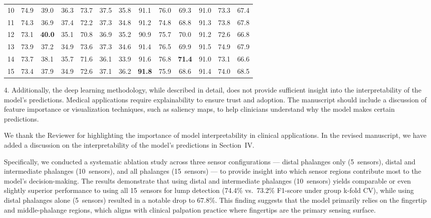 \documentclass[a4paper, onecolumn]{IEEEtran}
\newcommand\blue[1]{{\textcolor{white!30!blue}{#1}}}
\begin{document}
\begin{table}[tbh]
{\begin{tabular}{c c c c| c c c| c c c| c c c}
            10 & 74.9 & 39.0 & 36.3 & 73.7 & 37.5 & 35.8 & 91.1 & 76.0 & 69.3 & 91.0 & 73.3 & 67.4 \\
            11 & 74.3 & 36.9 & 37.4 & 72.2 & 37.3 & 34.8 & 91.2 & 74.8 & 68.8 & 91.3 & 73.8 & 67.8 \\
            12 & 73.1 & \textbf{40.0} & 35.1 & 70.8 & 36.9 & 35.2 & 90.9 & 75.7 & 70.0 & 91.2 & 72.6 & 66.8 \\
            13 & 73.9 & 37.2 & 34.9 & 73.6 & 37.3 & 34.6 & 91.4 & 76.5 & 69.9 & 91.5 & 74.9 & 67.9 \\
            14 & 73.7 & 38.1 & 35.7 & 71.6 & 36.1 & 33.9 & 91.6 & 76.8 & \textbf{71.4} & 91.0 & 73.1 & 66.6 \\
            15 & 73.4 & 37.9 & 34.9 & 72.6 & 37.1 & 36.2 & \textbf{91.8} & 75.9 & 68.6 & 91.4 & 74.0 & 68.5 \\
        \bottomrule
    \end{tabular}
    }
    \label{tab:fine_tuning_all}
\end{table}


\blue{4. Additionally, the deep learning methodology, while described in detail, does not provide sufficient insight into the interpretability of the model's predictions. Medical applications require explainability to ensure trust and adoption. The manuscript should include a discussion of feature importance or visualization techniques, such as saliency maps, to help clinicians understand why the model makes certain predictions.}

We thank the Reviewer for highlighting the importance of model interpretability in clinical applications. In the revised manuscript, we have added a discussion on the interpretability of the model's predictions in Section~IV.

Specifically, we conducted a systematic ablation study across three sensor configurations --- distal phalanges only (5~sensors), distal and intermediate phalanges (10~sensors), and all phalanges (15~sensors) --- to provide insight into which sensor regions contribute most to the model's decision-making. The results demonstrate that using distal and intermediate phalanges (10~sensors) yields comparable or even slightly superior performance to using all 15~sensors for lump detection (74.4\% vs.~73.2\% F1-score under group k-fold CV), while using distal phalanges alone (5~sensors) resulted in a notable drop to 67.8\%. This finding suggests that the model primarily relies on the fingertip and middle-phalange regions, which aligns with clinical palpation practice where fingertips are the primary sensing surface.
\end{document}
